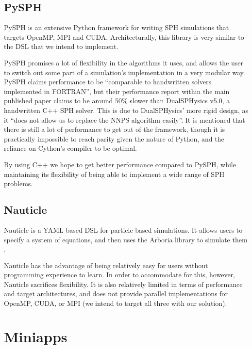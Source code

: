 \subsection{PySPH \cite{prabhu2021pysph}}

PySPH is an extensive Python framework for writing SPH simulations that targets OpenMP, MPI and CUDA. Architecturally, this library is very similar to the DSL that we intend to implement.

PySPH promises a lot of flexibility in the algorithms it uses, and allows the user to switch out some part of a simulation's implementation in a very modular way. PySPH claims performance to be ``comparable to handwritten solvers implemented in FORTRAN'', but their performance report within the main published paper claims to be around 50\% slower than DualSPHysics v5.0, a handwritten C++ SPH solver. This is due to DualSPHysics' more rigid design, as it ``does not allow us to replace the NNPS algorithm easily''. It is mentioned that there is still a lot of performance to get out of the framework, though it is practically impossible to reach parity given the nature of Python, and the reliance on Cython's compiler to be optimal.

By using C++ we hope to get better performance compared to PySPH, while maintaining its flexibility of being able to implement a wide range of SPH problems.

\subsection{Nauticle \cite{havasitoth2020nauticle}}
Nauticle is a YAML-based DSL for particle-based simulations. It allows users to specify a system of equations, and then uses the Arboria library to simulate them \cite{robinson2017arboria}.

Nauticle has the advantage of being relatively easy for users without programming experience to learn. In order to accommodate for this, however, Nauticle sacrifices flexibility. It is also relatively limited in terms of performance and target architectures, and does not provide parallel implementations for OpenMP, CUDA, or MPI (we intend to target all three with our solution). 




\section{Miniapps}

